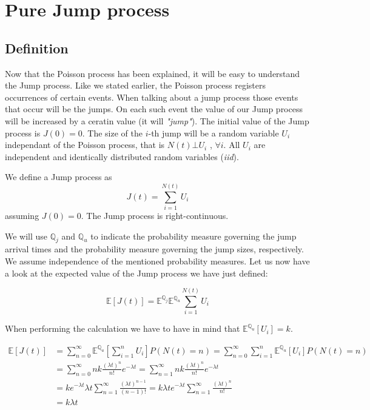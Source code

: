 \documentclass[times, utf8, diplomski]{fer}
\begin{document}
	\section{Pure Jump process}
		\subsection{Definition}
		Now that the Poisson process has been explained, it will be easy to understand the Jump process. Like we stated earlier, the Poisson process registers occurrences of certain events. When talking about a jump process those events that occur will be the jumps. On each such event the value of our Jump process will be increased by a ceratin value (it will \textit{"jump"}). The initial value of the Jump process is $J(0) = 0$. The size of the $i$-th jump will be a random variable $U_i$ independant of the Poisson process, that is $N(t) \bot U_i$ , $\forall i$. All $U_i$ are independent and identically distributed random variables (\textit{iid}).

		\begin{definition}
			We define a Jump process as 
			\begin{equation}
				J(t) = \sum_{i=1}^{N(t)} U_i
			\end{equation}
			assuming $J(0) = 0$. The Jump process is right-continuous.
		\end{definition}

		We will use $\mathbb{Q}_j$ and $\mathbb{Q}_u$ to indicate the probability measure governing the jump arrival times and the probability measure governing the jump sizes, respectively. We assume independence of the mentioned probability measures. Let us now have a look at the expected value of the Jump process we have just defined:

		\begin{equation} \label{eqn_e_jump} %
		\mathbb{E}[J(t)] = \mathbb{E}^{\mathbb{Q}_j}\mathbb{E}^{\mathbb{Q}_u} \sum_{i=1}^{N(t)} U_i
		\end{equation}

		\noindent When performing the calculation we have to have in mind that $\mathbb{E}^{\mathbb{Q}_u}[U_i] = k$.

		\begin{equation}
		\begin{split}
			\mathbb{E}[J(t)] &= \sum_{n=0}^{\infty}\mathbb{E}^{\mathbb{Q}_u} \left[ \sum_{i=1}^{n} U_i \right] P(N(t)=n) = \sum_{n=0}^{\infty}\sum_{i=1}^{n} \mathbb{E}^{\mathbb{Q}_u}\left[U_i\right] P(N(t)=n) \\
			&= \sum_{n=0}^{\infty} nk\frac{(\lambda t)^n}{n!}e^{-\lambda t} = \sum_{n=1}^{\infty} nk\frac{(\lambda t)^n}{n!}e^{-\lambda t} \\
			&= ke^{-\lambda t}\lambda t\sum_{n=1}^{\infty}\frac{(\lambda t)^{n-1}}{(n-1)!} = k\lambda te^{-\lambda t}\sum_{n=1}^{\infty}\frac{(\lambda t)^n}{n!} \\
			&= k\lambda t
		\end{split}
		\end{equation}
\end{document}
